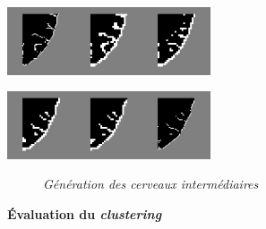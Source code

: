 \documentclass[12pt, oneside, a4paper, titlepage]{article}
\begin{document}
\centerline{\includegraphics[width=2cm, height=2cm]{fake_img.png}\hspace{5mm}\includegraphics[width=2cm, height=2cm]{fake_img0.png}\hspace{5mm}\includegraphics[width=2cm, height=2cm]{fake_img51.png}}
\centerline{\includegraphics[width=2cm, height=2cm]{fake_img81.png}\hspace{5mm}\includegraphics[width=2cm, height=2cm]{fake_img99.png}\hspace{5mm}\includegraphics[width=2cm, height=2cm]{fake_img100.png}}
\begin{figure}[H]
    \centering
    \caption{\textit{Génération des cerveaux intermédiaires}}
    \label{fig:gen_inter}
\end{figure}

\textbf{Évaluation du \textit{clustering}}\\
\end{document}
